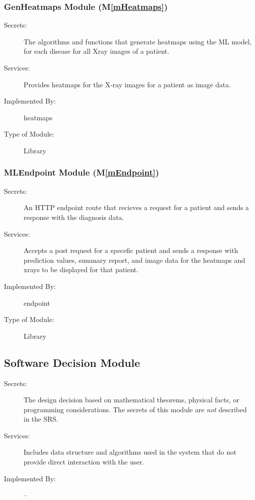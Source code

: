 \documentclass[12pt, titlepage]{article}
\newcommand{\mref}[1]{M\ref{#1}}
\begin{document}
\subsubsection{GenHeatmaps Module (\mref{mHeatmaps})}

\begin{description}
\item[Secrets:] The algorithms and functions that generate heatmaps using the ML model, for each disease for all Xray images of a patient.
\item[Services:] Provides heatmaps for the X-ray images for a patient as image data.
\item[Implemented By:] heatmaps
\item[Type of Module:] Library
\end{description}

\subsubsection{MLEndpoint Module (\mref{mEndpoint})}

\begin{description}
\item[Secrets:] An HTTP endpoint route that recieves a request for a patient and sends a response with the diagnosis data.
\item[Services:] Accepts a post request for a specefic patient and sends a response with prediction values, summary report, and image data for the heatmaps and xrays to be displayed for that patient.
\item[Implemented By:] endpoint
\item[Type of Module:] Library
\end{description}

\subsection{Software Decision Module}

\begin{description}
\item[Secrets:] The design decision based on mathematical theorems, physical
  facts, or programming considerations. The secrets of this module are
  \emph{not} described in the SRS.
\item[Services:] Includes data structure and algorithms used in the system that
  do not provide direct interaction with the user. 
\item[Implemented By:] --
\end{description}
\end{document}
